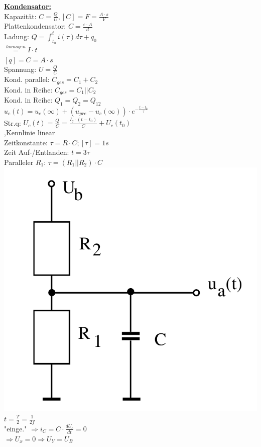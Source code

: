 \documentclass[8pt]{extarticle}
\begin{document}
\begin{minipage}{0.33\textwidth}
\underline{\textbf{Kondensator:}}\\
Kapazität: $C = \frac{Q}{U}, [C]=F=\frac{A \cdot s}{V}$\\
Plattenkondensator: $C=\frac{\varepsilon \cdot A }{d}$\\
Ladung: $Q = \int_{t_0}^t i(\tau) d\tau + q_0$\\
\phantom{sssssssis} $\stackrel{homogen}{=} I \cdot t$\\
\phantom{ssssssssssii} $[q]=C=A \cdot s$\\
Spannung: $U = \frac{Q}{C}$\\
Kond. parallel: $C_{ges} = C_1 + C_2$\\
Kond. in Reihe: $C_{ges} = C_1 || C_2$\\
Kond. in Reihe: $Q_1 = Q_2 = Q_{12}$\\
$u_c(t) = u_c(\infty) + (u_{pre} - u_c(\infty)) \cdot e^{-\frac{t-t_0}{\tau}}$\\
Str.q: $U_c(t) = \frac{Q}{C} = \frac{I_q \cdot (t-t_0)}{C} + U_c(t_0)$\\
\phantom{sss} ,Kennlinie linear\\
Zeitkonstante: $\tau = R \cdot C;[\tau] = 1s$\\
Zeit Auf-/Entlanden: $t = 3\tau$\\
Paralleler $R_1$: $\tau = (R_1 || R_2) \cdot C$\\
\includegraphics[scale=0.15]{kondensatorpr.png}\\
$t =\frac{T}{2} = \frac{1}{2f}$\\
"einge." $\Rightarrow i_C = C \cdot \frac{dU_c}{dt} = 0$\\
\phantom{sss} $\Rightarrow U_x = 0 \Rightarrow U_Y = U_B$


\end{minipage}
\end{document}
